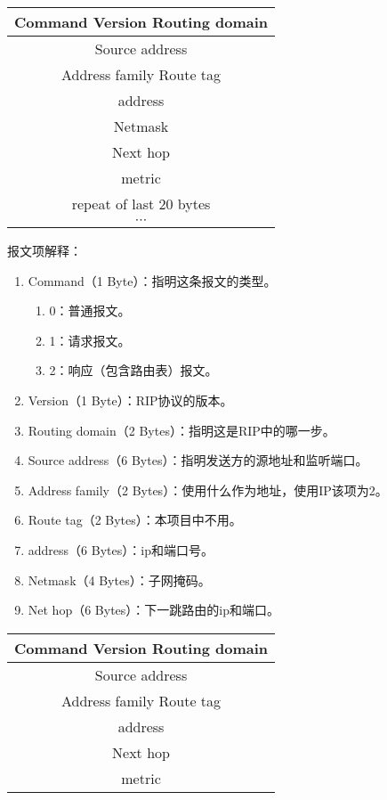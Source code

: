 \documentclass[15pt]{ctexart}
\begin{document}

\tableofcontents
\newpage

\begin{table}[H]
	\centering
	\begin{tabular}{|c|}
		\hline
		Command \; \vline \; Version \; \vline \; Routing domain \; \\
		\hline
		Source address \\
		\hline
		Address family \; \vline \; Route tag \; \\
		\hline
		address \\
		\hline
		Netmask \\
		\hline
		Next hop \\
		\hline
		metric \\
		\hline
		repeat of last 20 bytes \\
		\hline
		$\cdots$ \\
		\hline 
	\end{tabular}	
\end{table}
报文项解释：
\begin{enumerate}
	\item Command（1 Byte）：指明这条报文的类型。
	\begin{enumerate}[]
		\item 0：普通报文。
		\item 1：请求报文。
		\item 2：响应（包含路由表）报文。
	\end{enumerate}
	\item Version（1 Byte）：RIP协议的版本。
	\item Routing domain（2 Bytes）：指明这是RIP中的哪一步。
	\item Source address（6 Bytes）：指明发送方的源地址和监听端口。
	\item Address family（2 Bytes）：使用什么作为地址，使用IP该项为2。
	\item Route tag（2 Bytes）：本项目中不用。
	\item address（6 Bytes）：ip和端口号。
	\item Netmask（4 Bytes）：子网掩码。
	\item Net hop（6 Bytes）：下一跳路由的ip和端口。
\end{enumerate}
\begin{table}[H]
	\centering
	\begin{tabular}{|c|}
		\hline
		Command \; \vline \; Version \; \vline \; Routing domain \; \\
		\hline
		Source address \\
		\hline
		Address family \; \vline \; Route tag \; \\
		\hline
		address \\
		\hline
		Next hop \\
		\hline
		metric \\
		\hline
	\end{tabular}
\end{table}
\end{document}
